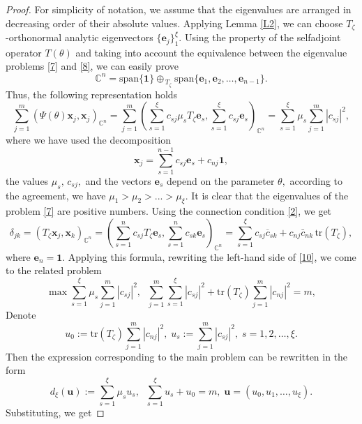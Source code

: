 \documentclass[10pt,a4paper]{amsart}
\begin{document}
\begin{proof} For simplicity of notation,  we assume that the eigenvalues  are arranged  in decreasing order of their absolute values.
 Applying Lemma \ref{L2}, we can choose  $T_{\zeta}$-orthonormal analytic eigenvectors $\{\mathbf{e}_{j}\}^{\xi}_{1}.$
Using the property of the selfadjoint operator $T(\theta)$ and taking into account the equivalence between the eigenvalue problems \eqref{7} and  \eqref{8}, we can easily prove
$$
\mathbb{C}^{n}=\mathrm{span}\{\mathbf{1}\}\oplus_{\,T_{\zeta}}\mathrm{span}\{\mathbf{e}_{1},\mathbf{e}_{2},\ldots,\mathbf{e}_{n-1}\}.
$$
Thus,  the following representation holds
$$
 \sum\limits_{j=1}^{m}( \Psi(\theta) \mathbf{x} _{j}  ,     \mathbf{x} _{j}   )_{\mathbb{C}^{n}}=  \sum\limits_{j=1}^{m}\left( \sum\limits_{s=1}^{\xi}c_{sj } \mu_{s}
          T_{\zeta}\mathbf{e}_{s},\sum\limits_{s=1}^{\xi} c_{sj } \mathbf{e}_{s} \right)_{\! \mathbb{C}^{n}}=
          \sum\limits_{s=1}^{\xi}\mu_{s} \sum\limits_{j=1}^{m}  |c_{sj }|^{2},
$$
where we have used the decomposition
$$
\mathbf{x} _{j}= \sum\limits_{s=1}^{n-1} c_{sj }\mathbf{e}_{s}+c_{nj} \mathbf{1},
$$
the values $\mu_{s},\,c_{sj },$ and the vectors $\mathbf{e}_{s}$ depend on the parameter $\theta,$ according to the   agreement, we have $\mu_{1}>\mu_{2}>...>\mu_{\xi}.$ It is clear that the eigenvalues of the problem  \eqref{7} are positive numbers. Using the connection condition \eqref{2}, we get
\begin{equation*}
 \delta_{jk}=(  T_{\zeta} \mathbf{x} _{j} ,\mathbf{x} _{k}   )_{\mathbb{C}^{n}}=
 \left(\sum\limits_{s=1}^{n}c_{sj }T_{\zeta}\mathbf{e}_{s},\sum\limits_{s=1}^{n} c_{sk }\mathbf{e}_{s} \right)_{\!\!\!\mathbb{C}^{n}}=
 \sum\limits_{s=1}^{\xi} c _{sj }\overline{c} _{sk }+c_{nj} \bar{c}_{nk}\,\mathrm{tr}(T_{\zeta}),
\end{equation*}
where $\mathbf{e}_{n}=\mathbf{1}.$
Applying this formula, rewriting the left-hand side of \eqref{10}, we come to the related  problem
$$
\max\limits \sum\limits_{s=1}^{\xi}\mu _{s} \sum\limits_{j=1}^{m}  |c_{sj }|^{2},
\;\;\sum\limits_{j=1}^{m}\sum\limits_{s=1}^{\xi} |c _{sj }|^{2}+\mathrm{tr}(T_{\zeta})\sum\limits_{j=1}^{m}|c _{nj }|^{2}=m,
$$
Denote
$$
u_{0}:=\mathrm{tr}(T_{\zeta})\sum\limits_{j=1}^{m}|c _{nj }|^{2},\;u_{s}:=\sum\limits_{j=1}^{m}  |c_{sj }|^{2},\;s=1,2,\ldots,\xi.
$$
Then  the expression corresponding to the  main problem can be rewritten in the form
$$
d_{\xi}(\mathbf{u}) :=\sum\limits_{s=1}^{\xi}\mu _{s}u_{s}  ,\;\;\sum\limits_{s=1}^{\xi}u_{s}+u_{0}=m,\;\mathbf{u}=(u_{0},u_{1},\ldots,u_{\xi}).
$$
Substituting, we get

\end{proof}
\end{document}

